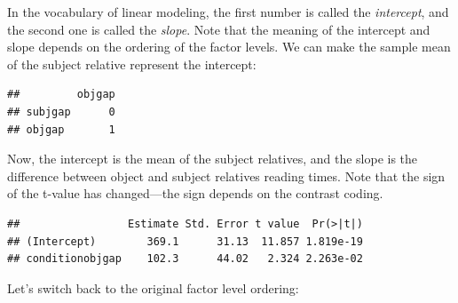 \documentclass[
  12pt,
]{krantz}
\newenvironment{Shaded}{\begin{snugshade}}{\end{snugshade}}
\newcommand{\AttributeTok}[1]{\textcolor[rgb]{0.77,0.63,0.00}{#1}}
\newcommand{\DocumentationTok}[1]{\textcolor[rgb]{0.56,0.35,0.01}{\textbf{\textit{#1}}}}
\newcommand{\FunctionTok}[1]{\textcolor[rgb]{0.00,0.00,0.00}{#1}}
\newcommand{\NormalTok}[1]{#1}
\newcommand{\OtherTok}[1]{\textcolor[rgb]{0.56,0.35,0.01}{#1}}
\newcommand{\SpecialCharTok}[1]{\textcolor[rgb]{0.00,0.00,0.00}{#1}}
\newcommand{\StringTok}[1]{\textcolor[rgb]{0.31,0.60,0.02}{#1}}
\theoremstyle{definition}
\theoremstyle{definition}
\theoremstyle{definition}
\theoremstyle{definition}
\theoremstyle{remark}
\begin{document}
In the vocabulary of linear modeling, the first number is called the \emph{intercept}, and the second one is called the \emph{slope}.
Note that the meaning of the intercept and slope depends on the ordering of the factor levels. We can make the sample mean of the subject relative represent the intercept:

\begin{Shaded}
\end{Shaded}

\begin{verbatim}
##         objgap
## subjgap      0
## objgap       1
\end{verbatim}

Now, the intercept is the mean of the subject relatives, and the slope is the difference between object and subject relatives reading times. Note that the sign of the t-value has changed---the sign depends on the contrast coding.

\begin{Shaded}
\end{Shaded}

\begin{verbatim}
##                 Estimate Std. Error t value  Pr(>|t|)
## (Intercept)        369.1      31.13  11.857 1.819e-19
## conditionobjgap    102.3      44.02   2.324 2.263e-02
\end{verbatim}

Let's switch back to the original factor level ordering:

\begin{Shaded}
\end{Shaded}
\end{document}
